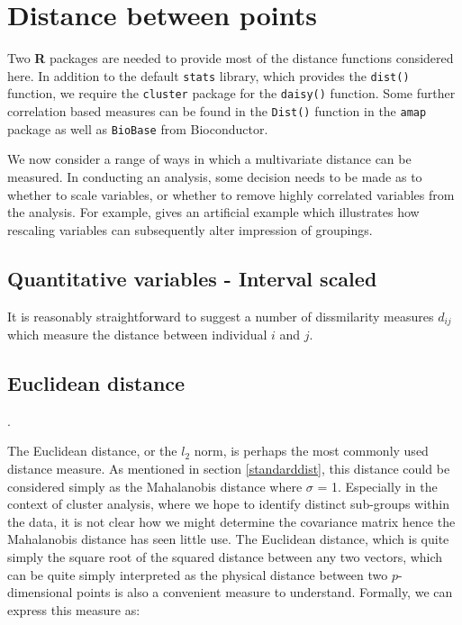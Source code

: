 \section{Distance between points}
\label{pointdistance}

Two \textbf{R} packages are needed to provide most of the distance functions considered here.   In addition to the default \verb+stats+ library, which provides the \verb+dist()+ function, we require the \verb+cluster+ package for the \verb+daisy()+ function.   Some further correlation based measures can be found in the \verb+Dist()+ function in the \verb+amap+ package as well as \verb+BioBase+ from Bioconductor.

We now consider a range of ways in which a multivariate distance can be measured.  In conducting an analysis, some decision needs to be made as to whether to scale variables, or whether to remove highly correlated variables from the analysis.   For example, \cite{Gnanadesikan:1997} gives an artificial example which illustrates how rescaling variables can subsequently alter impression of groupings.


\subsection{Quantitative variables - Interval scaled}
\label{distancequant}

It is reasonably straightforward to suggest a number of dissmilarity measures $d_{ij}$ which measure the distance between individual $i$ and $j$.

\subsection{Euclidean distance}.
\label{euclidean}

The Euclidean distance, or the $l_{2}$ norm, is perhaps the most commonly used distance measure.   As mentioned in section \ref{standarddist}, this distance could be considered simply as the Mahalanobis distance where $\sigma$ = 1.   Especially in the context of cluster analysis, where we hope to identify distinct sub-groups within the data, it is not clear how we might determine the covariance matrix hence the Mahalanobis distance has seen little use.   The Euclidean distance, which is quite simply the square root of the squared distance between any two vectors, which can be quite simply interpreted as the physical distance between two $p$-dimensional points is also a convenient measure to understand.  Formally, we can express this measure as:

